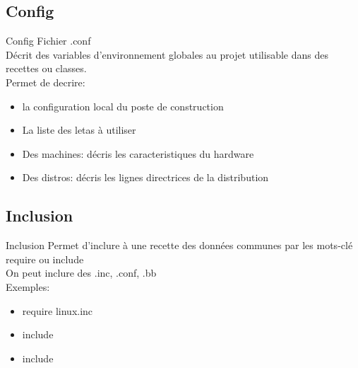 \subsection{Config}
\begin{frame}{Config}{}
	Fichier .conf\\
	Décrit des variables d'environnement globales au projet utilisable dans des recettes ou classes.\\
	Permet de decrire:
	\begin{itemize}
		\item
			la configuration local du poste de construction
		\item
			La liste des letas à utiliser
		\item
			Des machines: décris les caracteristiques du hardware
		\item
			Des distros: décris les lignes directrices de la distribution
	\end{itemize}
\end{frame}


\subsection{Inclusion}
\begin{frame}{Inclusion}{}
	Permet d'inclure à une recette des données communes par les mots-clé require ou include\\
	On peut inclure des .inc, .conf, .bb\\
	Exemples:
	\begin{itemize}
		\item
			require linux.inc
		\item
			include 
		\item
			include 
	\end{itemize}
\end{frame}